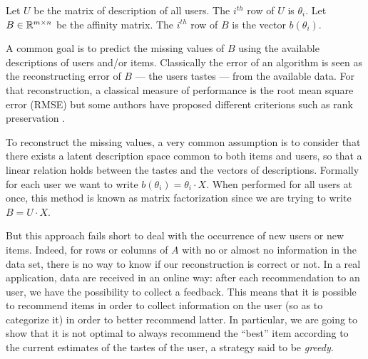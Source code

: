 \documentclass[twoside,leqno,twocolumn]{article}
\newcommand{\hai}[1]{\color{blue}(hai) #1\color{black}}
\begin{document}
Let $U$ be the matrix of description of all users. The $i^{th}$ row of $U$ is $\theta_i$. 
Let $B \in \mathbb{R}^{m \times n}$ be the affinity matrix. The $i^{th}$ row of $B$ is the vector $b(\theta_i)$.

A common goal is to predict the missing values of $B$ using the available descriptions of users and/or items. 
Classically the error of an algorithm is seen as the reconstructing error of $B$ --- the users tastes --- from the available data. For that reconstruction, a classical measure of performance is the root mean square error (RMSE) but some authors have proposed different criterions such as rank preservation \cite{Shi:2012:CLM:2365952.2365981}.

To reconstruct the missing values, a very common assumption is to consider that there exists a latent description space common to both items and users, so that a linear relation holds between the tastes and the vectors of descriptions. Formally for each user we want to write $b(\theta_i) = \theta_i \cdot X$. When performed for all users at once, this method is known as matrix factorization since we are trying to write $B = U \cdot X $.

But this approach fails short to deal with the occurrence of new users or new items. Indeed, for rows or columns of $A$ with no or almost no information in the data set, there is no way to know if our reconstruction is correct or not.
In a real application, data are received in an online way: after each recommendation to an user, we have the possibility to collect a feedback. This means that it is possible to recommend items in order to collect information on the user (so as to categorize it) in order to better recommend latter. In particular, we are going to show that it is not optimal to always recommend the ``best'' item according to the current estimates of the tastes of the user, a strategy said to be \emph{greedy}. 
 
\end{document}
